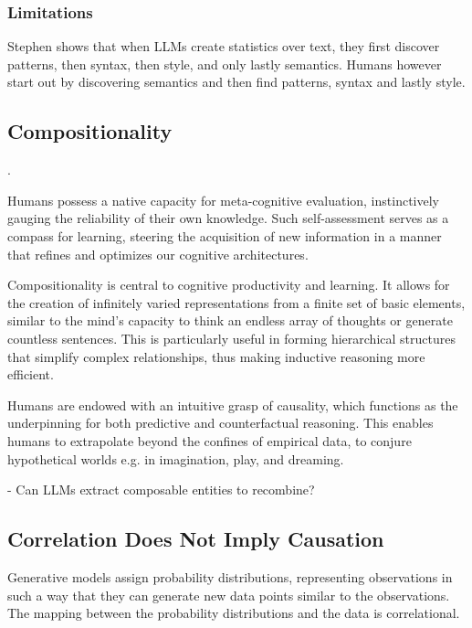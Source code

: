 \subsubsection{Limitations}
Stephen shows that when LLMs create statistics over text, they first discover patterns, then syntax, then style, and only lastly semantics. Humans however start out by discovering semantics and then find patterns, syntax and lastly style. 
















\subsection{Compositionality}
\cite{Lake_Ullman_Tenenbaum_Gershman_2017}.

Humans possess a native capacity for meta-cognitive evaluation, instinctively gauging the reliability of their own knowledge. Such self-assessment serves as a compass for learning, steering the acquisition of new information in a manner that refines and optimizes our cognitive architectures.

Compositionality is central to cognitive productivity and learning. It allows for the creation of infinitely varied representations from a finite set of basic elements, similar to the mind's capacity to think an endless array of thoughts or generate countless sentences. This is particularly useful in forming hierarchical structures that simplify complex relationships, thus making inductive reasoning more efficient.

Humans are endowed with an intuitive grasp of causality, which functions as the underpinning for both predictive and counterfactual reasoning.  This enables humans to extrapolate beyond the confines of empirical data, to conjure hypothetical worlds e.g. in imagination, play, and dreaming.


- Can LLMs extract composable entities to recombine?
\subsection{Correlation Does Not Imply Causation}

Generative models assign probability distributions, representing observations in such a way that they can generate new data points similar to the observations. The mapping between the probability distributions and the data is correlational. 

